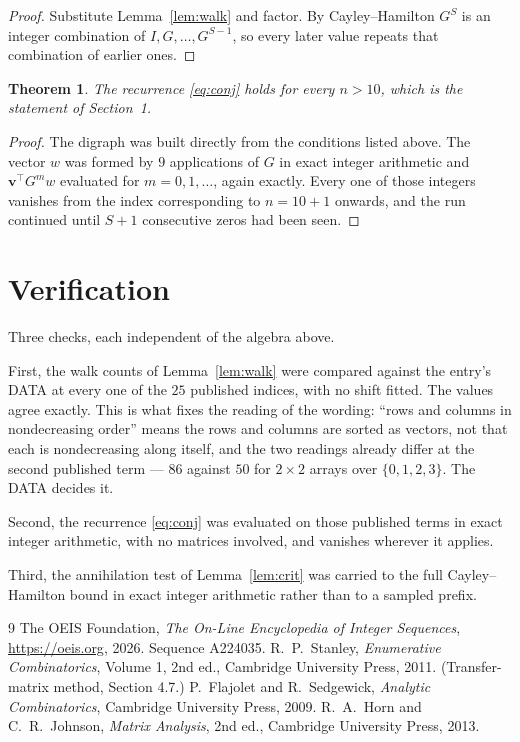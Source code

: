 \documentclass[11pt,a4paper]{article}
\theoremstyle{plain}
\newtheorem{theorem}{Theorem}
\theoremstyle{definition}
\begin{document}
\begin{proof}
Substitute Lemma~\ref{lem:walk} and factor. By Cayley--Hamilton $G^{S}$ is an integer
combination of $I,G,\dots,G^{S-1}$, so every later value repeats that combination of
earlier ones.
\end{proof}

\begin{theorem}
The recurrence \eqref{eq:conj} holds for every $n>10$, which is the statement of
Section~1.
\end{theorem}

\begin{proof}
The digraph was built directly from the conditions listed above. The vector $w$ was formed by
$9$ applications of $G$ in exact integer arithmetic and $\mathbf{v}^{\!\top}G^{m}w$
evaluated for $m=0,1,\dots$, again exactly. Every one of those integers vanishes from the
index corresponding to $n=10+1$ onwards, and the run continued until $S+1$ consecutive
zeros had been seen.
\end{proof}

\section{Verification}

Three checks, each independent of the algebra above.

First, the walk counts of Lemma~\ref{lem:walk} were compared against the entry's DATA at
every one of the $25$ published indices, with no shift fitted. The values agree exactly.
This is what fixes the reading of the wording: ``rows and columns in nondecreasing order''
means the rows and columns are sorted as vectors, not that each is nondecreasing along
itself, and the two readings already differ at the second published term --- $86$ against
$50$ for $2\times2$ arrays over $\{0,1,2,3\}$. The DATA decides it.

Second, the recurrence \eqref{eq:conj} was evaluated on those published terms in exact
integer arithmetic, with no matrices involved, and vanishes wherever it applies.

Third, the annihilation test of Lemma~\ref{lem:crit} was carried to the full
Cayley--Hamilton bound in exact integer arithmetic rather than to a sampled prefix.

\begin{thebibliography}{9}
 The OEIS Foundation, \emph{The On-Line Encyclopedia of Integer
Sequences}, \url{https://oeis.org}, 2026. Sequence A224035.
 R.~P.~Stanley, \emph{Enumerative Combinatorics}, Volume 1, 2nd ed.,
Cambridge University Press, 2011. (Transfer-matrix method, Section 4.7.)
 P.~Flajolet and R.~Sedgewick, \emph{Analytic Combinatorics}, Cambridge
University Press, 2009.
 R.~A.~Horn and C.~R.~Johnson, \emph{Matrix Analysis}, 2nd ed., Cambridge
University Press, 2013.
\end{thebibliography}
\end{document}
